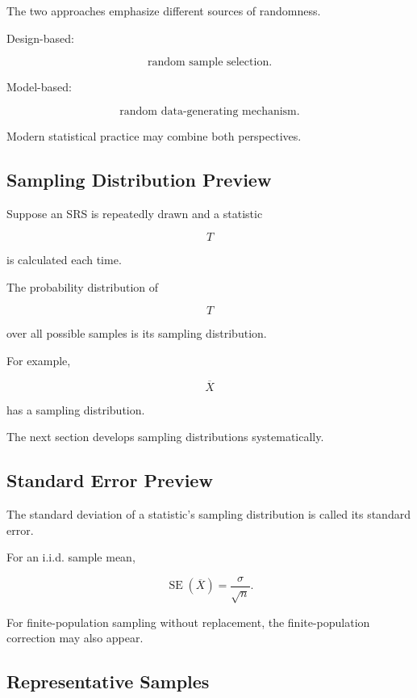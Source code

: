 The two approaches emphasize different sources of randomness.

Design-based:

\[
\boxed{
\text{random sample selection}.
}
\]

Model-based:

\[
\boxed{
\text{random data-generating mechanism}.
}
\]

Modern statistical practice may combine both perspectives.

\subsection{Sampling Distribution Preview}
\label{subsec:sampling-distribution-preview}

Suppose an SRS is repeatedly drawn and a statistic

\[
T
\]

is calculated each time.

The probability distribution of

\[
T
\]

over all possible samples is its sampling distribution.

For example,

\[
\boxed{
\overline{X}
}
\]

has a sampling distribution.

The next section develops sampling distributions systematically.

\subsection{Standard Error Preview}
\label{subsec:standard-error-sampling-preview}

The standard deviation of a statistic's sampling distribution is called
its standard error.

For an i.i.d. sample mean,

\[
\boxed{
\operatorname{SE}(\overline{X})
=
\frac{\sigma}{\sqrt{n}}.
}
\]

For finite-population sampling without replacement, the finite-population
correction may also appear.

\subsection{Representative Samples}
\label{subsec:representative-samples}

